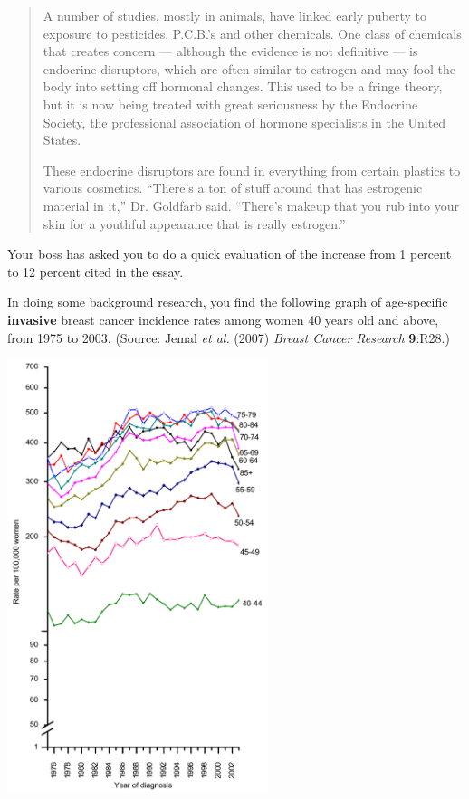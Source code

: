 \begin{quotation}
A number of studies, mostly in animals, have linked early puberty to exposure to pesticides, P.C.B.'s and other chemicals. One class of chemicals that creates concern --- although the evidence is not definitive --- is endocrine disruptors, which are often similar to estrogen and may fool the body into setting off hormonal changes. This used to be a fringe theory, but it is now being treated with great seriousness by the Endocrine Society, the professional association of hormone specialists in the United States.

These endocrine disruptors are found in everything from certain plastics to various cosmetics. ``There's a ton of stuff around that has estrogenic material in it,'' Dr. Goldfarb said. ``There's makeup that you rub into your skin for a youthful appearance that is really estrogen.''
\end{quotation}

Your boss has asked you to do a quick evaluation of the increase from 1 percent to 12 percent cited in the essay.  

In doing some background research, you find the following graph of age-specific {\bf invasive} breast cancer incidence rates among women 40 years old and above, from 1975 to 2003.  (Source: Jemal {\em et al.} (2007) {\em Breast Cancer Research} {\bf 9}:R28.)  

\includegraphics[width=3in]{bcr1672-1.png}

